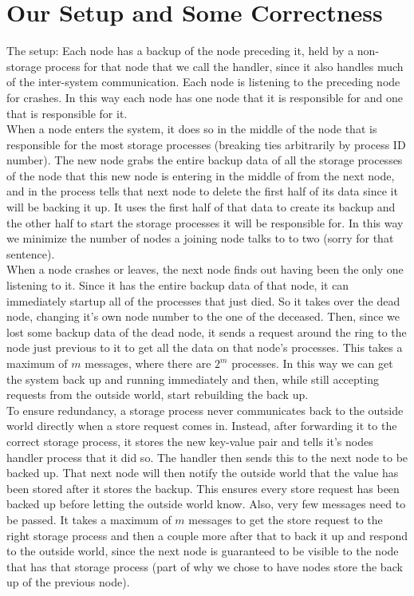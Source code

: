 \documentclass[12pt,letterpaper]{article}
\begin{document}
\section*{Our Setup and Some Correctness}
The setup:
Each node has a backup of the node preceding it, held by a non-storage process for that node that we call the handler, since it also handles much of the inter-system communication. Each node is listening to the preceding node for crashes. In this way each node has one node that it is responsible for and one that is responsible for it. \\
When a node enters the system, it does so in the middle of the node that is responsible for the most storage processes (breaking ties arbitrarily by process ID number). The new node grabs the entire backup data of all the storage processes of the node that this new node is entering in the middle of from the next node, and in the process tells that next node to delete the first half of its data since it will be backing it up. It uses the first half of that data to create its backup and the other half to start the storage processes it will be responsible for. In this way we minimize the number of nodes a joining node talks to to two (sorry for that sentence). \\
When a node crashes or leaves, the next node finds out having been the only one listening to it. Since it has the entire backup data of that node, it can immediately startup all of the processes that just died. So it takes over the dead node, changing it's own node number to the one of the deceased. Then, since we lost some backup data of the dead node, it sends a request around the ring to the node just previous to it to get all the data on that node's processes. This takes a maximum of $m$ messages, where there are $2^m$ processes. In this way we can get the system back up and running immediately and then, while still accepting requests from the outside world, start rebuilding the back up. \\
To ensure redundancy, a storage process never communicates back to the outside world directly when a store request comes in. Instead, after forwarding it to the correct storage process, it stores the new key-value pair and tells it's nodes handler process that it did so. The handler then sends this to the next node to be backed up. That next node will then notify the outside world that the value has been stored after it stores the backup. This ensures every store request has been backed up before letting the outside world know. Also, very few messages need to be passed. It takes a maximum of $m$ messages to get the store request to the right storage process and then a couple more after that to back it up and respond to the outside world, since the next node is guaranteed to be visible to the node that has that storage process (part of why we chose to have nodes store the back up of the previous node). \\
\end{document}
